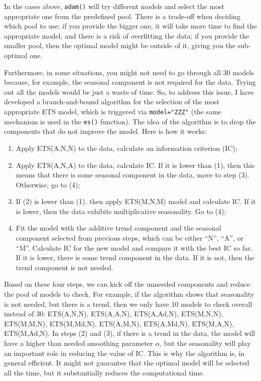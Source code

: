 \documentclass[
]{book}
\providecommand{\tightlist}{%
  \setlength{\itemsep}{0pt}\setlength{\parskip}{0pt}}
\theoremstyle{definition}
\theoremstyle{definition}
\theoremstyle{definition}
\theoremstyle{definition}
\theoremstyle{remark}
\begin{document}
In the cases above, \texttt{adam()} will try different models and select the most appropriate one from the predefined pool. There is a trade-off when deciding which pool to use: if you provide the bigger one, it will take more time to find the appropriate model, and there is a risk of overfitting the data; if you provide the smaller pool, then the optimal model might be outside of it, giving you the sub-optimal one.

Furthermore, in some situations, you might not need to go through all 30 models because, for example, the seasonal component is not required for the data. Trying out all the models would be just a waste of time. So, to address this issue, I have developed a branch-and-bound algorithm for the selection of the most appropriate ETS model, which is triggered via \texttt{model="ZZZ"} (the same mechanism is used in the \texttt{es()} function). The idea of the algorithm is to drop the components that do not improve the model. Here is how it works:

\begin{enumerate}
\def\labelenumi{\arabic{enumi}.}
\tightlist
\item
  Apply ETS(A,N,N) to the data, calculate an information criterion (IC);
\item
  Apply ETS(A,N,A) to the data, calculate IC. If it is lower than (1), then this means that there is some seasonal component in the data, move to step (3). Otherwise, go to (4);
\item
  If (2) is lower than (1), then apply ETS(M,N,M) model and calculate IC. If it is lower, then the data exhibits multiplicative seasonality. Go to (4);
\item
  Fit the model with the additive trend component and the seasonal component selected from previous steps, which can be either ``N'', ``A'', or ``M''. Calculate IC for the new model and compare it with the best IC so far. If it is lower, there is some trend component in the data. If it is not, then the trend component is not needed.
\end{enumerate}

Based on these four steps, we can kick off the unneeded components and reduce the pool of models to check. For example, if the algorithm shows that seasonality is not needed, but there is a trend, then we only have 10 models to check overall instead of 30: ETS(A,N,N), ETS(A,A,N), ETS(A,Ad,N), ETS(M,N,N), ETS(M,M,N), ETS(M,Md,N), ETS(A,M,N), ETS(A,Md,N), ETS(M,A,N), ETS(M,Ad,N). In steps (2) and (3), if there is a trend in the data, the model will have a higher than needed smoothing parameter \(\alpha\), but the seasonality will play an important role in reducing the value of IC. This is why the algorithm is, in general efficient. It might not guarantee that the optimal model will be selected all the time, but it substantially reduces the computational time.
\end{document}
